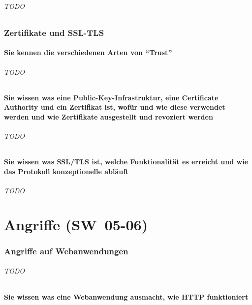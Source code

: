 \documentclass[10pt,a4paper]{article}
\begin{document}
\paragraph*{TODO}

\section{Zertifikate und SSL-TLS}
\subsection*{Sie kennen die verschiedenen Arten von "`Trust"'}
\paragraph*{TODO}
\subsection*{Sie wissen was eine Public-Key-Infrastruktur, eine Certificate Authority und ein Zertifikat ist, wofür und wie diese verwendet werden und wie Zertifikate ausgestellt und revoziert werden}
\paragraph*{TODO}
\subsection*{Sie wissen was SSL/TLS ist, welche Funktionalität es erreicht und wie das Protokoll konzeptionelle abläuft}
\paragraph*{TODO}

\part{Angriffe (SW~05-06)}
\section{Angriffe auf Webanwendungen}
\paragraph*{TODO}
\subsection*{Sie wissen was eine Webanwendung ausmacht, wie HTTP funktioniert}
\end{document}
